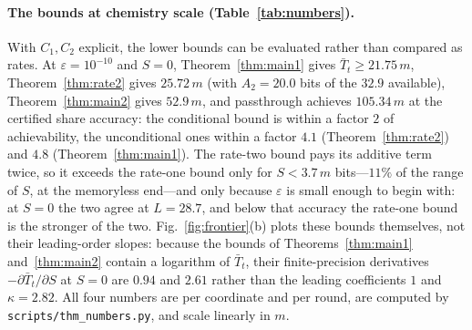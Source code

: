 \documentclass[aps,prx,twocolumn,superscriptaddress,nofootinbib,longbibliography]{revtex4-2}
\theoremstyle{plain}
\theoremstyle{definition}
\theoremstyle{remark}
\begin{document}
\paragraph{The bounds at chemistry scale (Table~\ref{tab:numbers}).} With $C_1,C_2$ explicit, the lower bounds can be evaluated rather than compared as rates. At $\varepsilon=10^{-10}$ and $S=0$, Theorem~\ref{thm:main1} gives $\bar T_t\ge21.75\,m$, Theorem~\ref{thm:rate2} gives $25.72\,m$ (with $A_2=20.0$ bits of the $32.9$ available), Theorem~\ref{thm:main2} gives $52.9\,m$, and passthrough achieves $105.34\,m$ at the certified share accuracy: the conditional bound is within a factor $2$ of achievability, the unconditional ones within a factor $4.1$ (Theorem~\ref{thm:rate2}) and $4.8$ (Theorem~\ref{thm:main1}). The rate-two bound pays its additive term twice, so it exceeds the rate-one bound only for $S<3.7\,m$ bits---$11\%$ of the range of $S$, at the memoryless end---and only because $\varepsilon$ is small enough to begin with: at $S=0$ the two agree at $L=28.7$, and below that accuracy the rate-one bound is the stronger of the two. Fig.~\ref{fig:frontier}(b) plots these bounds themselves, not their leading-order slopes: because the bounds of Theorems~\ref{thm:main1} and~\ref{thm:main2} contain a logarithm of $\bar T_t$, their finite-precision derivatives $-\partial\bar T_t/\partial S$ at $S=0$ are $0.94$ and $2.61$ rather than the leading coefficients $1$ and $\kappa=2.82$. All four numbers are per coordinate and per round, are computed by \texttt{scripts/thm\_numbers.py}, and scale linearly in $m$.
\end{document}
